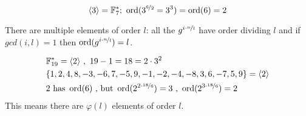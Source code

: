 \begin{example}
\[
\langle 3 \rangle = \mathbb{F}_7^{\ast}; \,\, \operatorname{ord}(3^{\nicefrac{6}{2}} = 3^3) = \operatorname{ord}(6) = 2
\]
\end{example}

There are multiple elements of order $l$: all the $g^{i \cdot \nicefrac{n}{l}}$ have order dividing $l$ and if $gcd(i,l)=1$ then $\operatorname{ord}(g^{i \cdot \nicefrac{n}{l}}) = l$.

\begin{example}
\begin{align*}
&\mathbb{F}_{19}^{\ast} = \langle 2 \rangle \,\, , \,\, 19 - 1 = 18 = 2 \cdot 3^2 \\
&\{ 1,2,4,8,-3,-6,7,-5,9,-1,-2,-4,-8,3,6,-7,5,9 \} = \langle 2 \rangle \\
&2 \text{ has } \operatorname{ord}(6) \text{ , but } \operatorname{ord}(2^{2 \cdot \nicefrac{18}{6}}) = 3 \text{ , } \operatorname{ord}(2^{3 \cdot \nicefrac{18}{6}}) = 2
\end{align*}
This means there are $\varphi(l)$ elements of order $l$.
\end{example}